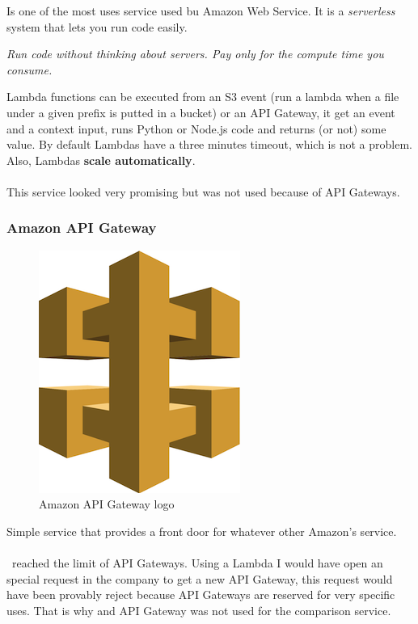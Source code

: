 Is one of the most uses service used bu Amazon Web Service. It is a \textit{serverless} system that lets you run code easily.

\begin{displayquote}
\textit{Run code without thinking about servers. Pay only for the compute time you consume.}
\end{displayquote}

Lambda\cite{lambda} functions can be executed from an S3 event (run a lambda when a file under a given prefix is putted in a bucket) or an API Gateway, it get an event and a context input, runs Python\cite{python} or Node.js\cite{nodejs} code and returns (or not) some value. By default Lambdas have a three minutes timeout, which is not a problem. Also, Lambdas \textbf{scale automatically}.
\\\\
This service looked very promising but was not used because of API Gateways.

\subsubsection*{Amazon API Gateway}

\begin{figure}[H]
\centering
\includegraphics[scale=0.2]{resources/api-logo.png}
\caption{Amazon API Gateway logo}
\end{figure}

Simple service that provides a front door for whatever other Amazon's service.
\\\\
\company\ reached the limit of API Gateways\cite{api-gateway}. Using a Lambda I would have open an special request in the company to get a new API Gateway, this request would have been provably reject because API Gateways are reserved for very specific uses. That is why  and API Gateway was not used for the comparison service.

